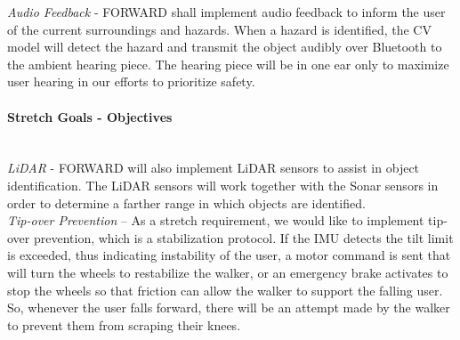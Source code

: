\noindent \textit{Audio Feedback} - FORWARD shall implement audio feedback to inform the user of the current surroundings and hazards. When a hazard is identified, the CV model will detect the hazard and transmit the object audibly over Bluetooth to the ambient hearing piece. The hearing piece will be in one ear only to maximize user hearing in our efforts to prioritize safety. 
\\


\paragraph {Stretch Goals - Objectives}

\noindent \\ \textit{LiDAR} - FORWARD will also implement LiDAR sensors to assist in object identification. The LiDAR sensors will work together with the Sonar sensors in order to determine a farther range in which objects are identified.  
\\


\noindent \textit{Tip-over Prevention} – As a stretch requirement, we would like to implement tip-over prevention, which is a stabilization protocol. If the IMU detects the tilt limit is exceeded, thus indicating instability of the user, a motor command is sent that will turn the wheels to restabilize the walker, or an emergency brake activates to stop the wheels so that friction can allow the walker to support the falling user. So, whenever the user falls forward, there will be an attempt made by the walker to prevent them from scraping their knees. \\